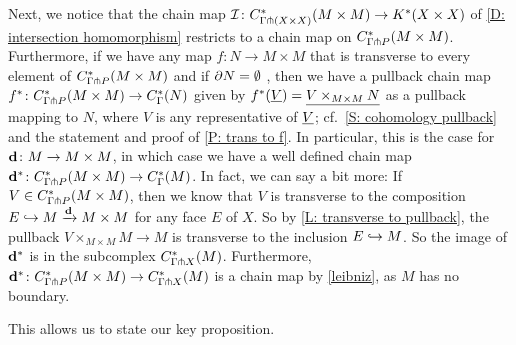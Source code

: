 Next, we notice that the chain map $\mathcal{I} \colon C^*_{\Gamma \pitchfork (X\times X)}(M\times M) \to K^*(X \times X)$ of \cref{D: intersection homomorphism} restricts to a chain map on $C^*_{\Gamma \pitchfork P}(M\times M)$.
Furthermore, if we have any map $f \colon N \to M \times M$ that is transverse to every element of $C^*_{\Gamma \pitchfork P}(M\times M)$ and if $\partial N = \emptyset$ , then we have a pullback chain map $f^* \colon C^*_{\Gamma \pitchfork P}(M\times M) \to C^*_\Gamma(N)$ given by $f^*(\underline{V}) = \underline{V \times_{M \times M} N}$ as a pullback mapping to $N$, where $V$ is any representative of $\underline{V}$; cf.\ \cref{S: cohomology pullback} and the statement and proof of \cref{P: trans to f}.
In particular, this is the case for $\mathbf{d} \colon M \to M \times M$, in which case we have a well defined chain map $\mathbf{d}^* \colon C^*_{\Gamma \pitchfork P}(M\times M) \to C^*_\Gamma(M)$.
In fact, we can say a bit more: If $V \in  C^*_{\Gamma \pitchfork P}(M\times M)$, then we know that $V$ is transverse to the composition $E \hookrightarrow M \xrightarrow{\mathbf{d}} M \times M$ for any face $E$ of $X$.
So by \cref{L: transverse to pullback}, the pullback $V \times_{M \times M} M \to M$ is transverse to the inclusion $E \hookrightarrow M$.
So the image of $\mathbf{d}^*$ is in the subcomplex $C^*_{\Gamma \pitchfork X}(M)$.
Furthermore, $\mathbf{d}^* \colon C^*_{\Gamma \pitchfork P}(M \times M) \to C^*_{\Gamma \pitchfork X}(M)$ is a chain map by \cref{leibniz}, as $M$ has no boundary.

This allows us to state our key proposition.

